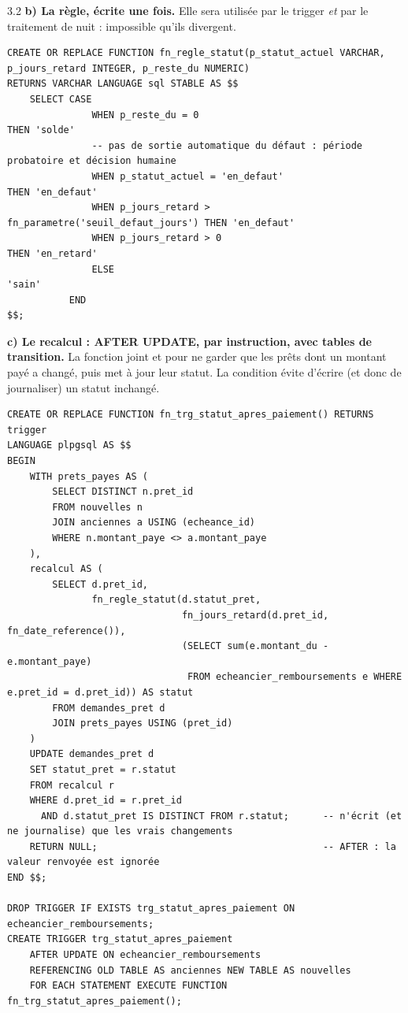 \begin{correction}{3.2}
\textbf{b) La règle, écrite une fois.} Elle sera utilisée par le trigger \emph{et} par le traitement de
nuit : impossible qu'ils divergent.
\begin{lstlisting}[style=long]
CREATE OR REPLACE FUNCTION fn_regle_statut(p_statut_actuel VARCHAR, p_jours_retard INTEGER, p_reste_du NUMERIC)
RETURNS VARCHAR LANGUAGE sql STABLE AS $$
    SELECT CASE
               WHEN p_reste_du = 0                                     THEN 'solde'
               -- pas de sortie automatique du défaut : période probatoire et décision humaine
               WHEN p_statut_actuel = 'en_defaut'                      THEN 'en_defaut'
               WHEN p_jours_retard > fn_parametre('seuil_defaut_jours') THEN 'en_defaut'
               WHEN p_jours_retard > 0                                 THEN 'en_retard'
               ELSE                                                         'sain'
           END
$$;
\end{lstlisting}

\textbf{c) Le recalcul : AFTER UPDATE, par instruction, avec tables de transition.} La fonction joint
 et  pour ne garder que les prêts dont un montant payé a changé, puis
met à jour leur statut. La condition  évite d'écrire (et donc de journaliser)
un statut inchangé.
\begin{lstlisting}[style=long]
CREATE OR REPLACE FUNCTION fn_trg_statut_apres_paiement() RETURNS trigger
LANGUAGE plpgsql AS $$
BEGIN
    WITH prets_payes AS (
        SELECT DISTINCT n.pret_id
        FROM nouvelles n
        JOIN anciennes a USING (echeance_id)
        WHERE n.montant_paye <> a.montant_paye
    ),
    recalcul AS (
        SELECT d.pret_id,
               fn_regle_statut(d.statut_pret,
                               fn_jours_retard(d.pret_id, fn_date_reference()),
                               (SELECT sum(e.montant_du - e.montant_paye)
                                FROM echeancier_remboursements e WHERE e.pret_id = d.pret_id)) AS statut
        FROM demandes_pret d
        JOIN prets_payes USING (pret_id)
    )
    UPDATE demandes_pret d
    SET statut_pret = r.statut
    FROM recalcul r
    WHERE d.pret_id = r.pret_id
      AND d.statut_pret IS DISTINCT FROM r.statut;      -- n'écrit (et ne journalise) que les vrais changements
    RETURN NULL;                                        -- AFTER : la valeur renvoyée est ignorée
END $$;

DROP TRIGGER IF EXISTS trg_statut_apres_paiement ON echeancier_remboursements;
CREATE TRIGGER trg_statut_apres_paiement
    AFTER UPDATE ON echeancier_remboursements
    REFERENCING OLD TABLE AS anciennes NEW TABLE AS nouvelles
    FOR EACH STATEMENT EXECUTE FUNCTION fn_trg_statut_apres_paiement();
\end{lstlisting}


\end{correction}
